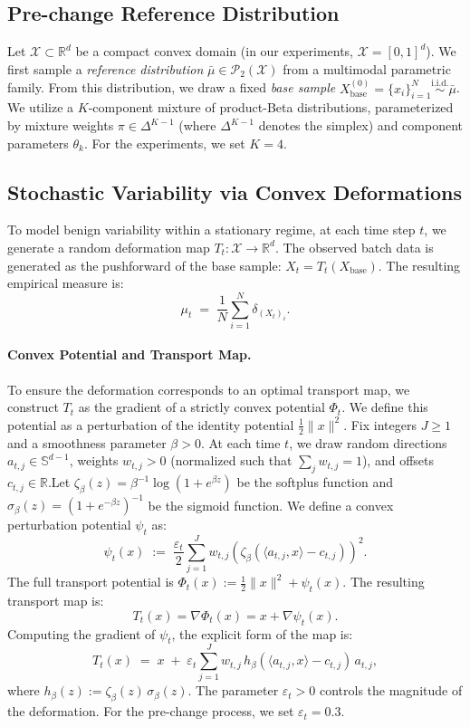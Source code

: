 \documentclass{article}
\theoremstyle{plain}
\theoremstyle{definition}
\theoremstyle{remark}
\begin{document}
\subsection{Pre-change Reference Distribution}Let $\mathcal{X} \subset \mathbb{R}^d$ be a compact convex domain (in our experiments, $\mathcal{X}=[0,1]^d$). 
We first sample a \emph{reference distribution} $\bar{\mu} \in \mathcal{P}_2(\mathcal{X})$ from a multimodal parametric family. From this distribution, we draw a fixed \emph{base sample} $X_{\mathrm{base}}^{(0)} = \{x_i\}_{i=1}^N \overset{\text{i.i.d.}}{\sim} \bar{\mu}$.
We utilize a $K$-component mixture of product-Beta distributions, parameterized by mixture weights $\pi \in \Delta^{K-1}$ (where $\Delta^{K-1}$ denotes the simplex) and component parameters $\theta_k$. 
For the experiments, we set $K=4$.

\subsection{Stochastic Variability via Convex Deformations}\label{app:convex_deform}

To model benign variability within a stationary regime, at each time step $t$, we generate a random deformation map $T_t: \mathcal{X} \to \mathbb{R}^d$. 
The observed batch data is generated as the pushforward of the base sample: $X_t = T_t(X_{\mathrm{base}})$. 
The resulting empirical measure is:$$  \mu_t \;=\; \frac1N\sum_{i=1}^N \delta_{(X_t)_i}.$$\paragraph{Convex Potential and Transport Map.}
To ensure the deformation corresponds to an optimal transport map, we construct $T_t$ as the gradient of a strictly convex potential $\Phi_t$. 
We define this potential as a perturbation of the identity potential $\frac{1}{2}\|x\|^2$.
Fix integers $J \ge 1$ and a smoothness parameter $\beta > 0$. 
At each time $t$, we draw random directions $a_{t,j} \in \mathbb{S}^{d-1}$, weights $w_{t,j} > 0$ (normalized such that $\sum_j w_{t,j} = 1$), and offsets $c_{t,j} \in \mathbb{R}$.Let $\zeta_\beta(z) = \beta^{-1}\log(1+e^{\beta z})$ be the softplus function and $\sigma_\beta(z) = (1+e^{-\beta z})^{-1}$ be the sigmoid function.
We define a convex perturbation potential $\psi_t$ as:
$$  \psi_t(x)
\;:=\;
\frac{\varepsilon_t}{2}\sum_{j=1}^J w_{t,j}
\left( \zeta_\beta(\langle a_{t,j}, x\rangle - c_{t,j}) \right)^2.$$
The full transport potential is $\Phi_t(x) := \frac{1}{2}\|x\|^2 + \psi_t(x)$. The resulting transport map is:
\begin{equation}\label{eq:map_family}
T_t(x) = \nabla \Phi_t(x) = x + \nabla \psi_t(x).
\end{equation}Computing the gradient of $\psi_t$, the explicit form of the map is:
$$  T_t(x) \;=\;
x \;+\; \varepsilon_t\sum_{j=1}^J w_{t,j}\,
h_\beta(\langle a_{t,j}, x\rangle - c_{t,j})\, a_{t,j},$$
where $h_\beta(z) := \zeta_\beta(z)\,\sigma_\beta(z)$. 
The parameter $\varepsilon_t > 0$ controls the magnitude of the deformation. 
For the pre-change process, we set $\varepsilon_t = 0.3$.
\end{document}
